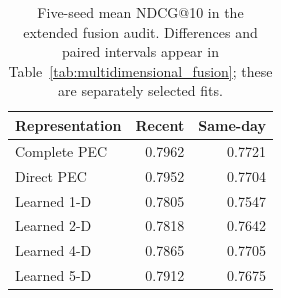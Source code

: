 \begin{table}[t]
\renewcommand{\arraystretch}{1.10}
\caption{Five-seed mean NDCG@10 in the extended fusion audit. Differences and paired intervals appear in Table~\ref{tab:multidimensional_fusion}; these are separately selected fits.}\label{tab:fusion_scores}
\centering\small
\begin{tabular*}{\linewidth}{@{\extracolsep{\fill}}lrr@{}}\toprule
Representation & Recent & Same-day\\\midrule
Complete PEC & 0.7962 & 0.7721\\
Direct PEC & 0.7952 & 0.7704\\
Learned 1-D & 0.7805 & 0.7547\\
Learned 2-D & 0.7818 & 0.7642\\
Learned 4-D & 0.7865 & 0.7705\\
Learned 5-D & 0.7912 & 0.7675\\\bottomrule
\end{tabular*}\end{table}
